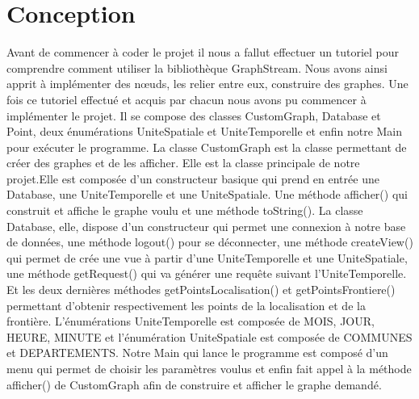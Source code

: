\chapter{Conception}
Avant de commencer à coder le projet il nous a fallut effectuer un tutoriel pour comprendre comment utiliser la bibliothèque GraphStream. Nous avons ainsi apprit à implémenter des nœuds, les relier entre eux, construire des graphes.
Une fois ce tutoriel effectué et acquis par chacun nous avons pu commencer à implémenter le projet. \newline
Il se compose des classes CustomGraph, Database et Point, deux énumérations UniteSpatiale et UniteTemporelle et enfin notre Main pour exécuter le programme.
\newline  La classe CustomGraph est la classe permettant de créer des graphes et de les afficher. Elle est la classe principale de notre projet.Elle est composée d'un constructeur basique qui prend en entrée une Database, une UniteTemporelle et une UniteSpatiale. Une méthode afficher() qui construit et affiche le graphe voulu et une méthode toString().
\newline La classe Database, elle, dispose d'un constructeur qui permet une connexion à notre base de données, une méthode logout() pour se déconnecter, une méthode createView() qui permet de crée une vue à partir d'une UniteTemporelle et une UniteSpatiale, une méthode getRequest() qui va générer une requête suivant l'UniteTemporelle. Et les deux dernières méthodes getPointsLocalisation() et getPointsFrontiere() permettant d'obtenir respectivement les points de la localisation et de la frontière.
\newline  L'énumérations UniteTemporelle est composée de MOIS, JOUR, HEURE, MINUTE et l'énumération UniteSpatiale est composée de COMMUNES et DEPARTEMENTS.
\newline  Notre Main qui lance le programme est composé d'un menu qui permet de choisir les paramètres voulus et enfin fait appel à la méthode afficher() de CustomGraph afin de construire et afficher le graphe demandé.
